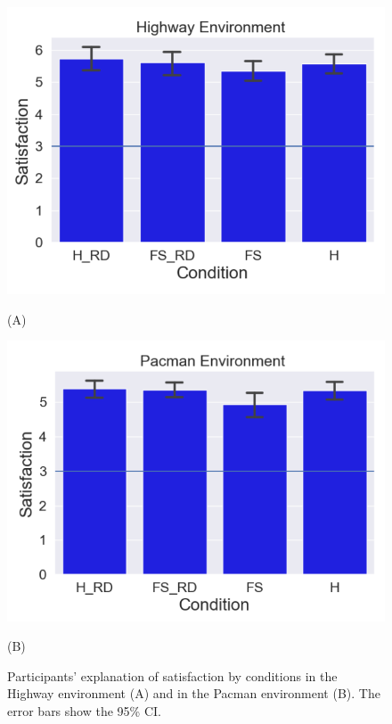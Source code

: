\begin{figure}[h]
\begin{minipage}{0.49\linewidth}
\centering

\includegraphics[width=\linewidth]{Highway_env_satisfaction.PNG}

(A)

\end{minipage}
\begin{minipage}{0.49\linewidth}
\centering

\includegraphics[width=\linewidth]{Pacman_env_satisfaction.PNG}

(B)
\end{minipage}
\caption{Participants' explanation of satisfaction by conditions in the Highway environment (A) and in the Pacman environment (B). The error bars show the 95\% CI. }
\label{fig:satisfaction}
    \vspace{-0.2cm}
\end{figure}

